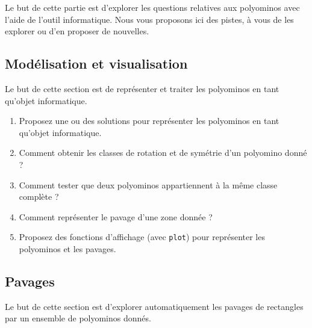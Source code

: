 \documentclass{../ficheTDTP}
\begin{document}
Le but de cette partie est d'explorer les questions relatives aux polyominos avec l'aide de l'outil informatique. Nous vous proposons ici des pistes, à vous de les explorer ou d'en proposer de nouvelles.

\subsection{Modélisation et visualisation}

Le but de cette section est de représenter et traiter les polyominos en tant qu'objet informatique.

\begin{enumerate}
\item Proposez une ou des solutions pour représenter les polyominos en tant qu'objet informatique.

\item Comment obtenir les classes de rotation et de symétrie d'un polyomino donné ?

\item Comment tester que deux polyominos appartiennent à la même classe complète ?

\item Comment représenter le pavage d'une zone donnée ?

\item Proposez des fonctions d'affichage (avec {\tt plot}) pour représenter les polyominos et les pavages.
\end{enumerate}

\subsection{Pavages}

Le but de cette section est d'explorer automatiquement les pavages de rectangles par un ensemble de polyominos donnés. 
\end{document}
